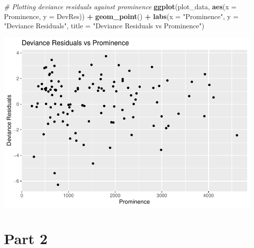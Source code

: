 \documentclass[
]{article}
\newenvironment{Shaded}{\begin{snugshade}}{\end{snugshade}}
\newcommand{\AttributeTok}[1]{\textcolor[rgb]{0.13,0.29,0.53}{#1}}
\newcommand{\CommentTok}[1]{\textcolor[rgb]{0.56,0.35,0.01}{\textit{#1}}}
\newcommand{\FunctionTok}[1]{\textcolor[rgb]{0.13,0.29,0.53}{\textbf{#1}}}
\newcommand{\NormalTok}[1]{#1}
\newcommand{\OtherTok}[1]{\textcolor[rgb]{0.56,0.35,0.01}{#1}}
\newcommand{\SpecialCharTok}[1]{\textcolor[rgb]{0.81,0.36,0.00}{\textbf{#1}}}
\newcommand{\StringTok}[1]{\textcolor[rgb]{0.31,0.60,0.02}{#1}}
\begin{document}
\begin{Shaded}
\begin{Highlighting}[]
\CommentTok{\# Plotting deviance residuals against prominence}
\FunctionTok{ggplot}\NormalTok{(plot\_data, }\FunctionTok{aes}\NormalTok{(}\AttributeTok{x =}\NormalTok{ Prominence, }\AttributeTok{y =}\NormalTok{ DevRes)) }\SpecialCharTok{+} \FunctionTok{geom\_point}\NormalTok{() }\SpecialCharTok{+} \FunctionTok{labs}\NormalTok{(}\AttributeTok{x =} \StringTok{"Prominence"}\NormalTok{,}
    \AttributeTok{y =} \StringTok{"Deviance Residuals"}\NormalTok{, }\AttributeTok{title =} \StringTok{"Deviance Residuals vs Prominence"}\NormalTok{)}
\end{Highlighting}
\end{Shaded}

\includegraphics{TMA4315_comp_ex_2_files/figure-latex/unnamed-chunk-3-2.pdf}

\hypertarget{part-2}{%
\section{Part 2}\label{part-2}}

\begin{Shaded}
\end{Shaded}
\end{document}
